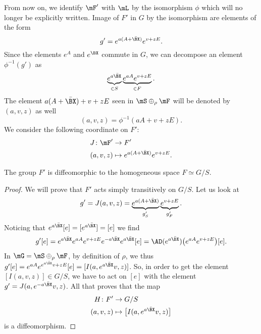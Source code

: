 From now on, we identify $\mF'$ with $\mL$ by the isomorphism $\phi$ which will no longer be explicitly written.  Image of $F'$ in $G$ by the isomorphism are elements of the form
\[ 
  g'= e^{a(A+\bar{\BX })} e^{v+zE}.
\]
Since the elements $ e^{A}$ and $ e^{\BX }$ commute in $G$, we can decompose an element $\phi^{-1}(g')$ as
\[ 
  \underbrace{e^{a\bar{\BX }}}_{\in S}\underbrace{e^{aA} e^{v+zE}}_{\in F}.
\]
The element $a(A+\bar{\BX })+v+zE$ seen in $\mS\oplus_{\rho}\mF$ will be denoted by $(a,v,z)$ as well
\[ 
  (a,v,z)=\phi^{-1}(aA+v+zE).
\]
We consider the following coordinate on $F'$:
\begin{equation} 
\begin{aligned}
 J\colon \mF'&\to F' \\ 
(a,v,z)&\mapsto  e^{a(A+\bar{\BX })} e^{v+zE}.
\end{aligned}
\end{equation}

\begin{proposition}
The group $F'$ is diffeomorphic to the homogeneous space $F\simeq G/S$.
\end{proposition}

\begin{proof}
We will prove that $F'$ acts simply transitively on $G/S$. Let us look at 
\begin{equation}		\label{EqgpJSF}
  g'=J(a,v,z)= \underbrace{e^{a(A+\bar{\BX })}}_{g'_{S}} \underbrace{e^{v+zE}}_{g'_{F}}.
\end{equation}
Noticing that $ e^{a\bar{\BX }}[e]=[ e^{a\bar{\BX }}]=[e]$ we find
\[ 
\begin{split}
g'[e]= e^{a\bar{\BX }} e^{aA} e^{v+zE} e^{-a\bar{\BX }} e^{a\bar{\BX }}[e]
		=\AD( e^{a\bar{\BX }})\big(  e^{aA} e^{v+zE} \big)[e].
\end{split}  
\]
In $\mG=\mS\oplus_{\rho}\mF$, by definition of $\rho$, we 
thus $g'[e]= e^{aA} e^{ e^{a\bar{\BX }}v+zE}[e]=[I(a, e^{a\bar{\BX }}v,z)]$. So, in order to get the element $[I(a,v,z)]\in G/S$, we have to act on $[e]$ with the element $g'=J(a, e^{-a\bar{\BX }}v,z)$. All that proves that the map
\begin{equation}
\begin{aligned}
 H\colon F'&\to G/S \\ 
(a,v,z)&\mapsto \big[ I(a, e^{a\bar{\BX }}v,z) \big]  
\end{aligned}
\end{equation}
is a diffeomorphism.
\end{proof}


